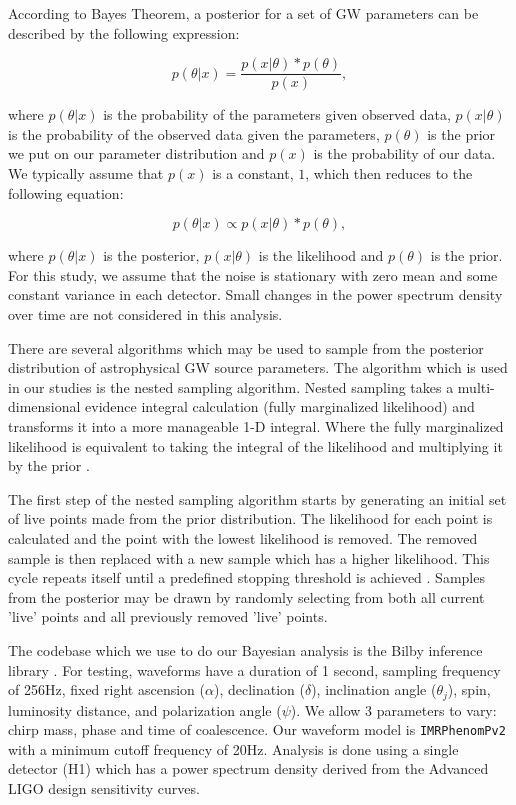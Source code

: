 \documentclass[%
showpacs,
 amsmath,amssymb,
 aps,
 twocolumn,
 prl,
 reprint,
floatfix,
]{revtex4-1}
\begin{document}
%
%
According to Bayes Theorem, a posterior for a set of GW parameters can be described 
by the following expression:

\begin{equation}
    p(\theta|x) = \frac{p(x|\theta) * p(\theta)}{p(x)},
\end{equation}

where $p(\theta|x)$ is the probability of the parameters given observed data, 
$p(x|\theta)$ is the probability of the observed data given the parameters, $p(\theta)$ 
is the prior we put on our parameter distribution and $p(x)$ is the probability of our data. 
We typically assume that $p(x)$ is a constant, $1$, which then reduces to the following equation:

\begin{equation}
    p(\theta|x) \propto p(x|\theta) * p(\theta),
\end{equation}

where $p(\theta|x)$ is the posterior, $p(x|\theta)$ is the likelihood and $p(\theta)$ is the prior. 
For this study, we assume that the noise is stationary with zero mean and some constant variance 
in each detector. Small changes in the power spectrum density over time are not considered in this analysis. 

%
%
There are several algorithms which may be used to sample from the posterior distribution 
of astrophysical GW source parameters. The algorithm which is used in our studies is 
the nested sampling algorithm. Nested sampling takes a multi-dimensional evidence 
integral calculation (fully marginalized likelihood) and transforms it into a more 
manageable 1-D integral. Where the fully marginalized likelihood is equivalent to taking 
the integral of the likelihood and multiplying it by the prior \cite{1409.7215}.

The first step of the nested sampling algorithm starts by generating an initial 
set of live points made from the prior distribution. The likelihood for each point 
is calculated and the point with the lowest likelihood is removed. The removed sample 
is then replaced with a new sample which has a higher likelihood. This cycle repeats 
itself until a predefined stopping threshold is achieved \cite{1409.7215}
. Samples 
from the posterior may be drawn by randomly selecting from both all current 'live' 
points and all previously removed 'live' points. 

%
%
The codebase which we use to do our Bayesian analysis is the Bilby inference library \cite{1811.02042}
. For testing, waveforms have a duration of 1 second, sampling frequency 
of 256Hz, fixed right ascension ($\alpha$), declination ($\delta$), inclination angle 
($\theta_j$), spin, luminosity distance, and polarization angle ($\psi$). We allow 3 
parameters to vary: chirp mass, phase and time of coalescence. Our waveform model is 
\texttt{IMRPhenomPv2} with a minimum cutoff frequency of 20Hz. Analysis is done using 
a single detector (H1) which has a power spectrum density derived from the Advanced 
LIGO design sensitivity curves.
\end{document}
